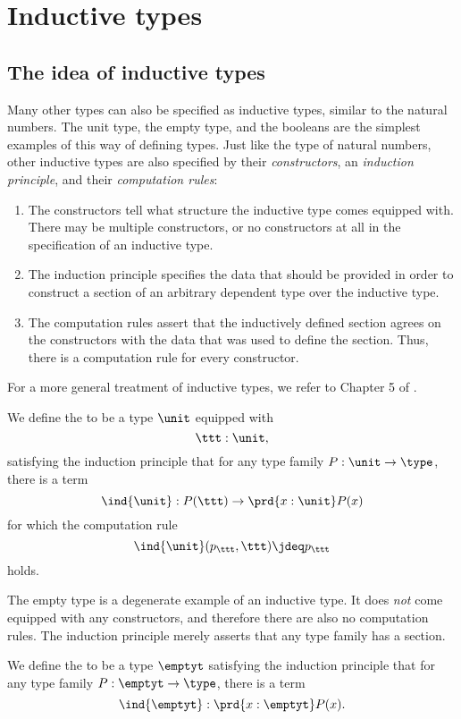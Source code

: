 \chapter{Inductive types}

\section{The idea of inductive types}

Many other types can also be specified as inductive types, similar to the natural numbers. The unit type, the empty type, and the booleans are the simplest examples of this way of defining types. Just like the type of natural numbers, other inductive types are also specified by their \emph{constructors}, an \emph{induction principle}, and their \emph{computation rules}: 
\begin{enumerate}
\item The constructors tell what structure the inductive type comes equipped with. There may be multiple constructors, or no constructors at all in the specification of an inductive type. 
\item The induction principle specifies the data that should be provided in order to construct a section of an arbitrary dependent type over the inductive type. 
\item The computation rules assert that the inductively defined section agrees on the constructors with the data that was used to define the section. Thus, there is a computation rule for every constructor.
\end{enumerate}
For a more general treatment of inductive types, we refer to Chapter 5 of \cite{hottbook}.
\begin{defn}
We define the  to be a type $\unit$ equipped with
\begin{equation*}
\ttt:\unit,
\end{equation*}
satisfying the induction principle that for any type family $P:\unit\to\type$, there is a term
\begin{equation*}
\ind{\unit} : P(\ttt)\to\prd{x:\unit}P(x)
\end{equation*}
for which the computation rule
\begin{equation*}
\ind{\unit}(p_{\ttt},\ttt) \jdeq p_\ttt
\end{equation*}
holds.
\end{defn}

The empty type is a degenerate example of an inductive type. It does \emph{not} come equipped with any constructors, and therefore there are also no computation rules. The induction principle merely asserts that any type family has a section.
\begin{defn}
We define the  to be a type $\emptyt$ satisfying the induction principle that for any type family $P:\emptyt\to\type$, there is a term
\begin{equation*}
\ind{\emptyt} : \prd{x:\emptyt}P(x).
\end{equation*}
\end{defn}

